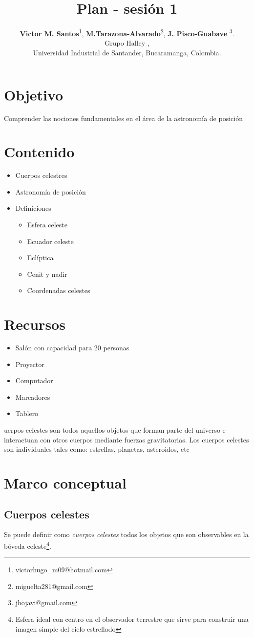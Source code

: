 \documentclass[10pt,a4paper]{article}
\title{Plan - sesión 1}
\author{\textbf{Victor M. Santos}\thanks{victorhugo\_m09@hotmail.com}, \textbf{M.Tarazona-Alvarado}\thanks{miguelta281@gmail.com}, \textbf{J. Pisco-Guabave} \thanks{jhojavi@gmail.com}. \\ Grupo Halley , \\ Universidad Industrial de Santander, Bucaramanga, Colombia.}
\date{ }
\begin{document}
\maketitle

\tableofcontents
\section{Objetivo}
Comprender las nociones fundamentales en el área de la astronomía de posición
\section{Contenido}
\begin{itemize}
\item Cuerpos celestres 
\item Astronomía de posición
\item Definiciones 
 \begin{itemize}
  \item Esfera celeste
  \item Ecuador celeste
  \item Eclíptica
  \item Cenit y nadir
  \item Coordenadas celestes
 \end{itemize}
\end{itemize}
\section{Recursos}
\begin{itemize}
 \item Salón con capacidad para 20 personas
 \item Proyector
 \item Computador
 \item Marcadores
 \item Tablero
\end{itemize}

uerpos celestes son todos aquellos objetos que forman parte del universo e interactuan con otros cuerpos mediante fuerzas gravitatorias. Los cuerpos celestes son individuales tales como: estrellas, planetas, asteroidos, etc

\section{Marco conceptual}
\subsection{Cuerpos celestes}
Se puede definir como \textit{cuerpos celestes} todos los objetos que son observables en la bóveda celeste\footnote{Esfera ideal con centro en el observador terrestre que sirve para construir una imagen simple del cielo estrellado}.
\end{document}

